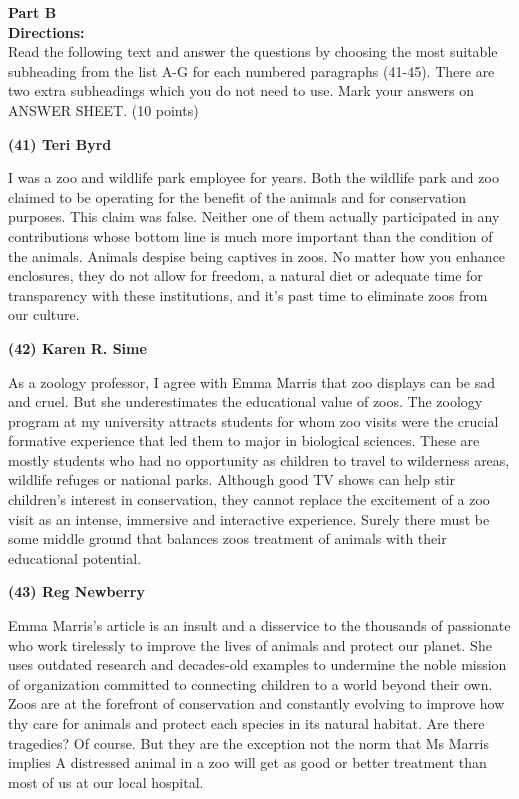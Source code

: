 \newpage

\noindent
\textbf{Part B}\\
\textbf{Directions:}\\
Read the following text and answer the questions by choosing the most
suitable subheading from the list
A-G for each numbered paragraphs (41-45). There are two extra subheadings
which you do not need to use.
Mark your answers on ANSWER SHEET. (10 points)

\TiGanSpace


\textbf{(41) Teri Byrd}

I was a zoo and wildlife park employee for years. Both the wildlife park
and zoo claimed to be operating for
the benefit of the animals and for conservation purposes. This claim was
false. Neither one of them actually
participated in any contributions whose bottom line is much more
important than the condition of the animals.
Animals despise being captives in zoos. No matter how you enhance
enclosures, they do not allow for freedom, a
natural diet or adequate time for transparency with these institutions,
and it's past time to eliminate zoos from our
culture.



\textbf{(42) Karen R. Sime}

As a zoology professor, I agree with Emma Marris that zoo displays can
be sad and cruel. But she
underestimates the educational value of zoos. The zoology program at my
university attracts students for whom
zoo visits were the crucial formative experience that led them to major
in biological sciences. These are mostly
students who had no opportunity as children to travel to wilderness
areas, wildlife refuges or national parks.
Although good TV shows can help stir children's interest in
conservation, they cannot replace the excitement of a
zoo visit as an intense, immersive and interactive experience. Surely
there must be some middle ground that
balances zoos treatment of animals with their educational potential.




\textbf{(43) Reg Newberry}


Emma Marris's article is an insult and a disservice to the thousands of
passionate who work tirelessly to
improve the lives of animals and protect our planet. She uses outdated
research and decades-old examples to
undermine the noble mission of organization committed to connecting
children to a world beyond their own. Zoos
are at the forefront of conservation and constantly evolving to improve
how thy care for animals and protect each
species in its natural habitat. Are there tragedies? Of course. But they
are the exception not the norm that Ms
Marris implies A distressed animal in a zoo will get as good or better
treatment than most of us at our local
hospital.




